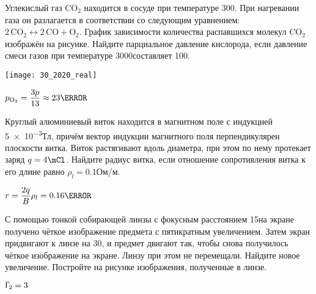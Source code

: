 \documentclass[a4paper,12pt]{extarticle}
\begin{document}
\begin{question}[ID=30]
  Углекислый газ $\text{CO}_2$ находится в сосуде при температуре 300\K.
  При нагревании газа он разлагается в соответствии со следующим
  уравнением: $2\,\text{CO}_2 \leftrightarrow 2\,\text{CO} + \text{O}_2$.
  График зависимости количества распавшихся молекул $\text{CO}_2$ изображён
  на рисунке. Найдите парциальное давление кислорода, если давление смеси
  газов при температуре 3000\K составляет 100\kPa.

    \hfil\texttt{[image: 30\_2020\_real]}\\
  \begin{solution} $p_{\text{O}_2} = \dfrac{3p}{13} \approx 23\kPa$ \end{solution}
\end{question}

\begin{question}[ID=31]
  Круглый алюминиевый виток находится в магнитном поле с индукцией
  \num{5e-3}\;Тл, причём вектор индукции магнитного поля перпендикулярен
  плоскости витка. Виток растягивают вдоль диаметра, при этом по нему
  протекает заряд $q=4\mCl$. Найдите радиус витка, если отношение
  сопротивления витка к его длине равно $\rho_l=\num{0.1}$\;Ом/м.

  \begin{solution} $r = \dfrac{2q}{B}\rho_l = \num{0.16}\m$ \end{solution}
\end{question}

\begin{question}[ID=32]
  С помощью тонкой собирающей линзы с фокусным расстоянием 15\cm на экране
  получено чёткое изображение предмета с пятикратным увеличением. Затем
  экран придвигают к линзе на 30\cm, и предмет двигают так, чтобы снова
  получилось чёткое изображение на экране. Линзу при этом не перемещали.
  Найдите новое увеличение. Постройте на рисунке изображения, полученные в
  линзе.
  \begin{solution} $\Upgamma_2 = 3$ \end{solution}
\end{question}

\end{document}

